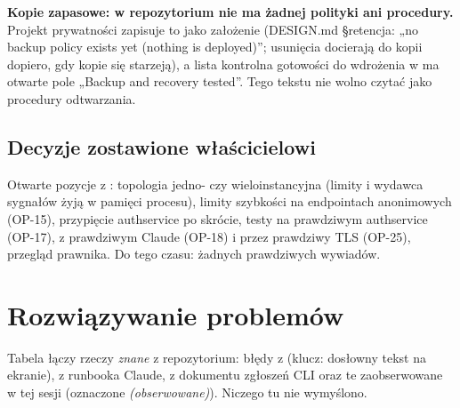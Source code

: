 {\textbf{Kopie zapasowe: w repozytorium nie ma żadnej polityki ani procedury.}
Projekt prywatności zapisuje to jako założenie (DESIGN.md §retencja: „no backup
policy exists yet (nothing is deployed)”; usunięcia docierają do kopii
dopiero, gdy kopie się starzeją), a lista kontrolna gotowości do wdrożenia w
 ma otwarte pole „Backup and recovery tested”.
Tego tekstu nie wolno czytać jako procedury odtwarzania.

\subsection{Decyzje zostawione właścicielowi}

Otwarte pozycje z : topologia jedno- czy
wieloinstancyjna (limity i wydawca sygnałów żyją w pamięci procesu), limity
szybkości na endpointach anonimowych (OP-15), przypięcie authservice po skrócie,
testy na prawdziwym authservice (OP-17), z prawdziwym Claude (OP-18) i przez
prawdziwy TLS (OP-25), przegląd prawnika. Do tego czasu: żadnych prawdziwych
wywiadów.

\section{Rozwiązywanie problemów}

Tabela łączy rzeczy \emph{znane} z repozytorium: błędy z
 (klucz: dosłowny tekst na ekranie), z runbooka
Claude, z dokumentu zgłoszeń CLI oraz te zaobserwowane w tej sesji (oznaczone
\emph{(obserwowane)}). Niczego tu nie wymyślono.

}
